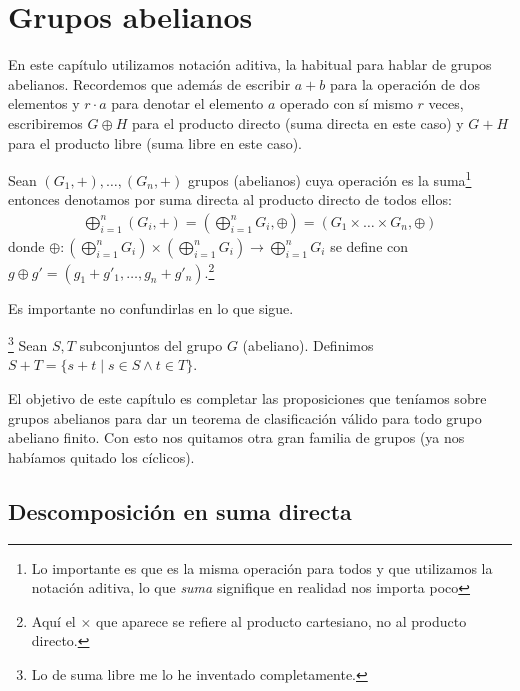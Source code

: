 
\chapter{Grupos abelianos}

En este capítulo utilizamos notación aditiva, la habitual para hablar de grupos abelianos. Recordemos que además de escribir $a+b$ para la operación de dos elementos y $r\cdot a$ para denotar el elemento $a$ operado con sí mismo $r$ veces, escribiremos $G \oplus H$ para el producto directo (suma directa en este caso) y $G + H$ para el producto libre (suma libre en este caso).

\begin{dfn}
	\label{dfn:sumadirecta}
	Sean $(G_1, +), \dots, (G_n, +)$ grupos (abelianos) cuya operación es la suma\footnote{Lo importante es que es la misma operación para todos y que utilizamos la notación aditiva, lo que \textit{suma} signifique en realidad nos importa poco} entonces denotamos por suma directa al producto directo de todos ellos:
	\begin{align*}
	\bigoplus_{i=1}^n (G_i, +) = \left(\bigoplus_{i=1}^n G_i, \oplus\right) = (G_1 \times \dots \times G_n, \oplus)
	\end{align*}
	donde $\oplus: (\bigoplus_{i=1}^n G_i) \times (\bigoplus_{i=1}^n G_i) \to \bigoplus_{i=1}^n G_i$ se define con $g \oplus g' = (g_1 + g'_1, \dots, g_n + g'_n)$.\footnote{Aquí el $\times$ que aparece se refiere al producto cartesiano, no al producto directo.}
\end{dfn}

Es importante no confundirlas en lo que sigue.

\begin{dfn}\footnote{Lo de suma libre me lo he inventado completamente.}
	\label{dfn:sumalibre}
	Sean $S,T$ subconjuntos del grupo $G$ (abeliano). Definimos $S+T = \{s+ t \mid s \in S \land t \in T\}$.
\end{dfn}

El objetivo de este capítulo es completar las proposiciones que teníamos sobre grupos abelianos para dar un teorema de clasificación válido para todo grupo abeliano finito. Con esto nos quitamos otra gran familia de grupos (ya nos habíamos quitado los cíclicos).

\section{Descomposición en suma directa}

